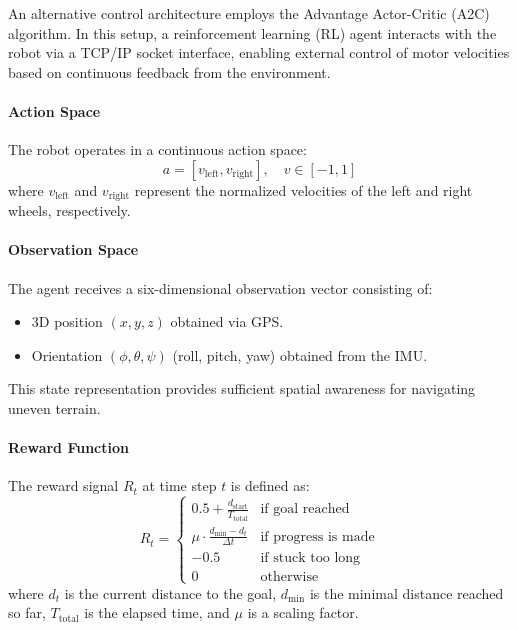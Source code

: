 \documentclass[11pt,twocolumn]{article}
\begin{document}
An alternative control architecture employs the Advantage Actor-Critic (A2C) algorithm. In this setup, a reinforcement learning (RL) agent interacts with the robot via a TCP/IP socket interface, enabling external control of motor velocities based on continuous feedback from the environment.

\paragraph{Action Space}

The robot operates in a continuous action space:
\[
a = [v_{\text{left}}, v_{\text{right}}], \quad v \in [-1, 1]
\]
where $v_{\text{left}}$ and $v_{\text{right}}$ represent the normalized velocities of the left and right wheels, respectively.

\paragraph{Observation Space}

The agent receives a six-dimensional observation vector consisting of:

\begin{itemize}
    \item 3D position $(x, y, z)$ obtained via GPS.
    \item Orientation $(\phi, \theta, \psi)$ (roll, pitch, yaw) obtained from the IMU.
\end{itemize}

This state representation provides sufficient spatial awareness for navigating uneven terrain.

\paragraph{Reward Function}

The reward signal \( R_t \) at time step \( t \) is defined as:
\[
R_t = 
\begin{cases}
0.5 + \frac{d_{\text{start}}}{T_{\text{total}}} & \text{if goal reached} \\
\mu \cdot \frac{d_{\min} - d_t}{\Delta t} & \text{if progress is made} \\
-0.5 & \text{if stuck too long} \\
0 & \text{otherwise}
\end{cases}
\]
where \( d_t \) is the current distance to the goal, \( d_{\min} \) is the minimal distance reached so far, \( T_{\text{total}} \) is the elapsed time, and \( \mu \) is a scaling factor.
\end{document}

